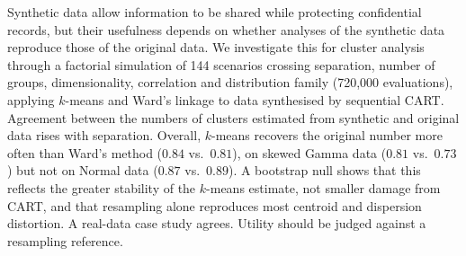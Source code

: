 Synthetic data allow information to be shared while protecting confidential
records, but their usefulness depends on whether analyses of the synthetic data
reproduce those of the original data. We investigate this for cluster analysis
through a factorial simulation of 144 scenarios crossing separation, number of
groups, dimensionality, correlation and distribution family (720{,}000
evaluations), applying $k$-means and Ward's linkage to data synthesised by
sequential CART. Agreement between the numbers of clusters estimated from
synthetic and original data rises with separation. Overall, $k$-means recovers
the original number more often than Ward's method ($0.84$ vs.\ $0.81$), on
skewed Gamma data ($0.81$ vs.\ $0.73$) but not on Normal data ($0.87$ vs.\
$0.89$). A bootstrap null shows that this reflects the greater stability of the
$k$-means estimate, not smaller damage from CART, and that resampling alone
reproduces most centroid and dispersion distortion. A real-data case study
agrees. Utility should be judged against a resampling reference.%
